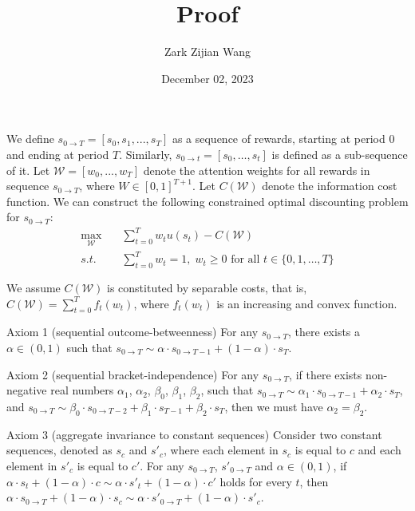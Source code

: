 \documentclass[
  12pt,
]{article}
\title{Proof}
\author{Zark Zijian Wang}
\date{December 02, 2023}
\begin{document}
\maketitle

We define \(s_{0\rightarrow T}=[s_0,s_1,...,s_T]\) as a sequence of
rewards, starting at period 0 and ending at period \(T\). Similarly,
\(s_{0\rightarrow t}=[s_0,…,s_t]\) is defined as a sub-sequence of it.
Let \(\mathcal{W}=[w_0,...,w_T]\) denote the attention weights for all
rewards in sequence \(s_{0\rightarrow T}\), where \(W\in[0,1]^{T+1}\).
Let \(C(\mathcal{W})\) denote the information cost function. We can
construct the following constrained optimal discounting problem for
\(s_{0\rightarrow T}\):\[\tag{A.1}
\begin{aligned}
\max_{\mathcal{W}}  \quad &\sum_{t=0}^T w_tu(s_t) - C(\mathcal{W}) \\
s.t. \quad &  \sum_{t=0}^T w_t=1,\; w_t \geq 0 \text{ for all } t\in\{0,1,…,T\} \\ \\
\end{aligned}
\]We assume \(C(\mathcal{W})\) is constituted by separable costs, that
is, \(C(\mathcal{W})=\sum_{t=0}^Tf_t(w_t)\), where \(f_t(w_t)\) is an
increasing and convex function.

Axiom 1 (sequential outcome-betweenness) For any \(s_{0\rightarrow T}\),
there exists a \(\alpha\in(0,1)\) such that
\(s_{0\rightarrow T} \sim \alpha\cdot s_{0\rightarrow T-1}+(1-\alpha) \cdot s_T\).

Axiom 2 (sequential bracket-independence) For any
\(s_{0\rightarrow T}\), if there exists non-negative real numbers
\(\alpha_1\), \(\alpha_2\), \(\beta_0\), \(\beta_1\), \(\beta_2\), such
that
\(s_{0\rightarrow T}\sim \alpha_1 \cdot s_{0\rightarrow T-1} + \alpha_2 \cdot s_{T}\),
and
\(s_{0\rightarrow T}\sim \beta_0 \cdot s_{0\rightarrow T-2}+\beta_1 \cdot s_{T-1}+\beta_2 \cdot s_{T}\),
then we must have \(\alpha_2 = \beta_2\).

Axiom 3 (aggregate invariance to constant sequences) Consider two
constant sequences, denoted as \(s_c\) and \(s'_c\), where each element
in \(s_c\) is equal to \(c\) and each element in \(s'_c\) is equal to
\(c'\). For any \(s_{0\rightarrow T}\), \(s'_{0\rightarrow T}\) and
\(\alpha\in(0,1)\), if
\(\alpha \cdot s_t+(1-\alpha)\cdot c\sim\alpha \cdot s'_t+(1-\alpha)\cdot c'\)
holds for every \(t\), then
\(\alpha \cdot s_{0\rightarrow T}+(1-\alpha)\cdot s_c\sim \alpha \cdot s'_{0\rightarrow T}+(1-\alpha)\cdot s'_c\).
\end{document}
